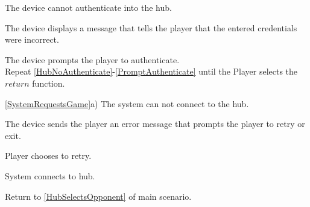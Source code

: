 \documentclass[12pt]{article}
\newenvironment{enumerate*}%
  {\begin{enumerate}%
  	\setlength{\parsep}{0pt}
    \setlength{\itemsep}{0pt}%
    \setlength{\parskip}{0pt}}%
  {\end{enumerate}}
\begin{document}
\begin{enumerate*}
\item \label{HubNoAuthenticate}The device cannot authenticate into the hub.
\item The device displays a message that tells the player that the entered credentials were incorrect.
\item \label{PromptAuthenticate}The device prompts the player to authenticate.\\
Repeat \ref{HubNoAuthenticate}-\ref{PromptAuthenticate} until the Player selects the $return$ function.
\end{enumerate*}
\ref{SystemRequestsGame}a) The system can not connect to the hub.
\begin{enumerate*}
\item The device sends the player an error message that prompts the player to retry or exit.
\item Player chooses to retry.
\item System connects to hub.
\item Return to \ref{HubSelectsOpponent} of main scenario.
\end{enumerate*}
\end{document}
